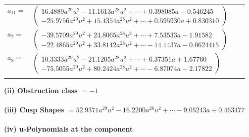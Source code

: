 \documentclass[1p]{elsarticle_modified}
\theoremstyle{definition}
\begin{document}
\begin{tabular}{m{7pt} m{180pt} m{7pt} m{180pt} }
\flushright $a_{11}=$&$\begin{pmatrix}16.4889 a^{29} u^{2}-11.1613 a^{28} u^{2}+\cdots+0.398085 a-0.546245\\-25.9756 a^{29} u^{2}+15.4354 a^{28} u^{2}+\cdots+0.595930 a+0.830310\end{pmatrix}$ \\
\flushright $a_{7}=$&$\begin{pmatrix}-39.5709 a^{29} u^{2}+24.8065 a^{28} u^{2}+\cdots+7.53533 a-1.91582\\-22.4865 a^{29} u^{2}+33.8142 a^{28} u^{2}+\cdots-14.1437 a-0.0624415\end{pmatrix}$ \\
\flushright $a_{8}=$&$\begin{pmatrix}10.3333 a^{29} u^{2}-21.1205 a^{28} u^{2}+\cdots+6.37351 a+1.67760\\-75.5055 a^{29} u^{2}+80.2424 a^{28} u^{2}+\cdots-6.87074 a-2.17822\end{pmatrix}$\\&\end{tabular}
\flushleft \textbf{(ii) Obstruction class $= -1$}\\~\\
\flushleft \textbf{(iii) Cusp Shapes $= 52.9371 a^{29} u^{2}-16.2200 a^{28} u^{2}+\cdots-9.05243 a+0.463477$}\\~\\
\newpage\renewcommand{\arraystretch}{1}
\flushleft \textbf{(iv) u-Polynomials at the component}\newline \\
\end{document}
